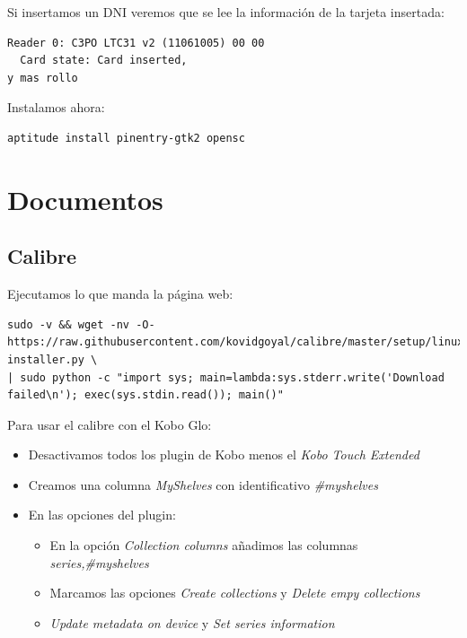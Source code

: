 \documentclass[12pt,spanish,]{article}
\providecommand{\tightlist}{%
  \setlength{\itemsep}{0pt}\setlength{\parskip}{0pt}}
\begin{document}
Si insertamos un DNI veremos que se lee la información de la tarjeta
insertada:

\begin{verbatim}
Reader 0: C3PO LTC31 v2 (11061005) 00 00
  Card state: Card inserted, 
y mas rollo
\end{verbatim}

Instalamos ahora:

\begin{verbatim}
aptitude install pinentry-gtk2 opensc
\end{verbatim}

\section{Documentos}\label{documentos}

\subsection{Calibre}\label{calibre}

Ejecutamos lo que manda la página web:

\begin{verbatim}
sudo -v && wget -nv -O- https://raw.githubusercontent.com/kovidgoyal/calibre/master/setup/linux-installer.py \
| sudo python -c "import sys; main=lambda:sys.stderr.write('Download failed\n'); exec(sys.stdin.read()); main()"
\end{verbatim}

Para usar el calibre con el Kobo Glo:

\begin{itemize}
\item
  Desactivamos todos los plugin de Kobo menos el \emph{Kobo Touch
  Extended}
\item
  Creamos una columna \emph{MyShelves} con identificativo
  \emph{\#myshelves}
\item
  En las opciones del plugin:

  \begin{itemize}
  \tightlist
  \item
    En la opción \emph{Collection columns} añadimos las columnas
    \emph{series,\#myshelves}
  \item
    Marcamos las opciones \emph{Create collections} y \emph{Delete empy
    collections}
  \item
    \emph{Update metadata on device} y \emph{Set series information}
  \end{itemize}
\end{itemize}
\end{document}
